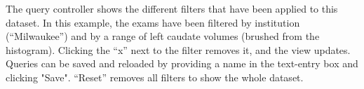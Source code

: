 \label{fig:query}
The query controller shows the different filters that have been applied to this dataset. In this example, the exams have been filtered by institution (``Milwaukee'') and by a range of left caudate volumes (brushed from the histogram). Clicking the ``x'' next to the filter removes it, and the view updates. Queries can be saved and reloaded by providing a name in the text-entry box and clicking "Save". ``Reset'' removes all filters to show the whole dataset.